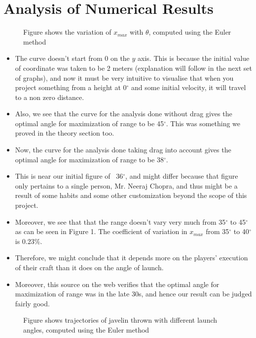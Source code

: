 \documentclass[12pt]{article}
\begin{document}
\section{Analysis of Numerical Results}
\begin{figure}[H]
    \centering
    
    \caption{Figure shows the variation of $x_{max}$ with $\theta$, computed using the Euler method}
    \label{fig:my_label2}
\end{figure}
\begin{itemize}
    \item The curve doesn’t start from 0 on the $y$ axis. This is because the initial value of coordinate was taken to be 2 meters (explanation will follow in the next set of graphs), and now it must be very intuitive to visualise that when you project something from a height at 0$^\circ$ and some initial velocity, it will travel to a non zero distance.
    \item Also, we see that the curve for the analysis done without drag gives the optimal angle for maximization of range to be 45$^\circ$. This was something we proved in the theory section too. 
    \item Now, the curve for the analysis done taking drag into account gives the optimal angle for maximization of range to be 38$^\circ$.
    \item This is near our initial figure of ~36$^\circ$, and might differ because that figure only pertains to a single person, Mr. Neeraj Chopra, and thus might be a result of some habits and some other customization beyond the scope of this project. 
    \item Moreover, we see that that the range doesn't vary very much from 35$^\circ$ to 45$^\circ$ as can be seen in Figure 1. The coefficient of variation in $x_{max}$ from 35$^\circ$ to 40$^\circ$ is 0.23\%.
    \item Therefore, we might conclude that it depends more on the players' execution of their craft than it does on the angle of launch. 
    \item Moreover, this source\cite{ref4} on the web verifies that the optimal angle for maximization of range was in the late 30s, and hence our result can be judged fairly good.
\end{itemize}
\begin{figure}[H]
    \centering
    
    \caption{Figure shows trajectories of javelin thrown with different launch angles, computed using the Euler method}
    \label{fig:my_label1}
\end{figure}
\end{document}
